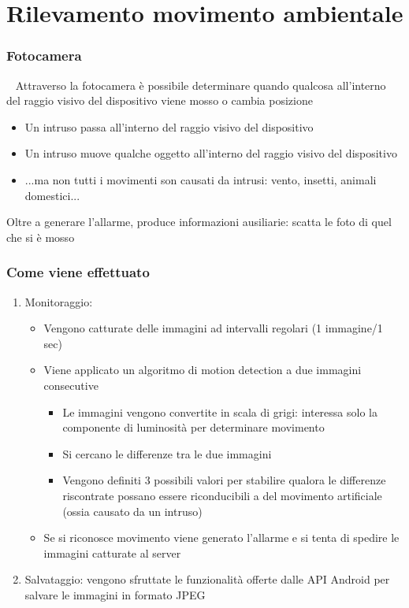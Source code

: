 \documentclass{beamer}
\begin{document}
\section{Rilevamento movimento ambientale}
\begin{frame}
\frametitle{Fotocamera}
\begin{block}{~}
Attraverso la fotocamera è possibile determinare quando qualcosa all'interno del raggio visivo del dispositivo viene mosso o cambia posizione
\end{block}
\begin{itemize}
  \item Un intruso passa all'interno del raggio visivo del dispositivo
  \item Un intruso muove qualche oggetto all'interno del raggio visivo del dispositivo
  \item ...ma non tutti i movimenti son causati da intrusi: vento, insetti, animali domestici...
\end{itemize}
Oltre a generare l'allarme, produce informazioni ausiliarie: scatta le foto di quel che si è mosso
\end{frame}

\begin{frame}
\frametitle{Come viene effettuato}
\begin{enumerate}
  \item Monitoraggio:
\begin{itemize}
  \item Vengono catturate delle immagini ad intervalli regolari (1 immagine/1 sec)
  \item Viene applicato un algoritmo di motion detection a due immagini consecutive
    \begin{itemize}
      \item Le immagini vengono convertite in scala di grigi: interessa solo la componente di luminosità per determinare movimento
      \item Si cercano le differenze tra le due immagini
      \item Vengono definiti 3 possibili valori per stabilire qualora le differenze riscontrate possano essere riconducibili a del movimento artificiale (ossia causato da un intruso)
    \end{itemize}
  \item Se si riconosce movimento viene generato l'allarme e si tenta di spedire le immagini catturate al server
\end{itemize}
  \item Salvataggio: vengono sfruttate le funzionalità offerte dalle API Android per salvare le immagini in formato JPEG
\end{enumerate}
\end{frame}
\end{document}
